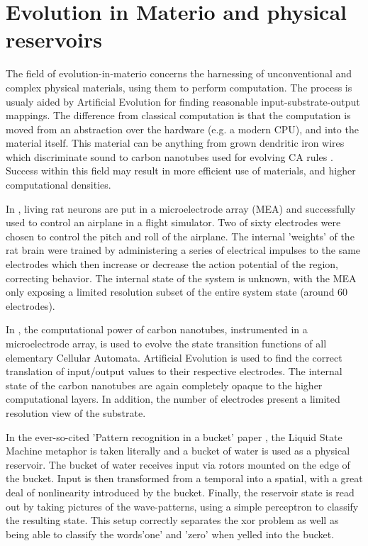\section{Evolution in Materio and physical reservoirs}

The field of evolution-in-materio \cite{miller2002evolution} concerns the harnessing of unconventional and complex physical materials,
using them to perform computation.
The process is usualy aided by Artificial Evolution for finding reasonable input-substrate-output mappings.
The difference from classical computation is that the computation is moved from an abstraction over the hardware (e.g. a modern CPU), and into the material itself.
This material can be anything from grown dendritic iron wires which discriminate sound \cite{pask1958physical} to carbon nanotubes used for evolving CA rules \cite{farstad2015evolving}.
Success within this field may result in more efficient use of materials,
and higher computational densities.

In \cite{demarse2005adaptive},
living rat neurons are put in a microelectrode array (MEA) and successfully used to control an airplane in a flight simulator.
Two of sixty electrodes were chosen to control the pitch and roll of the airplane.
The internal 'weights' of the rat brain were trained by administering a series of electrical impulses to the same electrodes which then increase or decrease the action potential of the region,
correcting behavior.
The internal state of the system is unknown,
with the MEA only exposing a limited resolution subset of the entire system state
(around 60 electrodes).

In \cite{farstad2015evolving}, the computational power of carbon nanotubes,
instrumented in a microelectrode array,
is used to evolve the state transition functions of all elementary Cellular Automata.
Artificial Evolution is used to find the correct translation of input/output values to their respective electrodes.
The internal state of the carbon nanotubes are again completely opaque to the higher computational layers.
In addition, the number of electrodes present a limited resolution view of the substrate.

In the ever-so-cited 'Pattern recognition in a bucket' paper \cite{fernando2003pattern},
the Liquid State Machine metaphor is taken literally and a bucket of water is used as a physical reservoir.
The bucket of water receives input via rotors mounted on the edge of the bucket.
Input is then transformed from a temporal into a spatial, with a great deal of nonlinearity introduced by the bucket.
Finally, the reservoir state is read out by taking pictures of the wave-patterns,
using a simple perceptron to classify the resulting state.
This setup correctly separates the xor problem as well as being able to classify the words'one' and 'zero' when yelled into the bucket.

